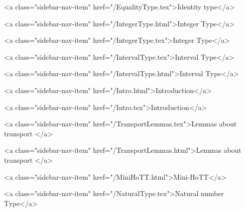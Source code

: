       
        
          <a class="sidebar-nav-item" href="/EqualityType.tex">Identity type</a>
        
      
    
      
        
          <a class="sidebar-nav-item" href="/IntegerType.html">Integer Type</a>
        
      
    
      
        
          <a class="sidebar-nav-item" href="/IntegerType.tex">Integer Type</a>
        
      
    
      
        
          <a class="sidebar-nav-item" href="/IntervalType.tex">Interval Type</a>
        
      
    
      
        
          <a class="sidebar-nav-item" href="/IntervalType.html">Interval Type</a>
        
      
    
      
        
          <a class="sidebar-nav-item" href="/Intro.html">Introduction</a>
        
      
    
      
        
          <a class="sidebar-nav-item" href="/Intro.tex">Introduction</a>
        
      
    
      
        
          <a class="sidebar-nav-item" href="/TransportLemmas.tex">Lemmas about transport </a>
        
      
    
      
        
          <a class="sidebar-nav-item" href="/TransportLemmas.html">Lemmas about transport </a>
        
      
    
      
        
          <a class="sidebar-nav-item" href="/MiniHoTT.html">Mini-HoTT</a>
        
      
    
      
        
          <a class="sidebar-nav-item" href="/NaturalType.tex">Natural number Type</a>
        
      
    
